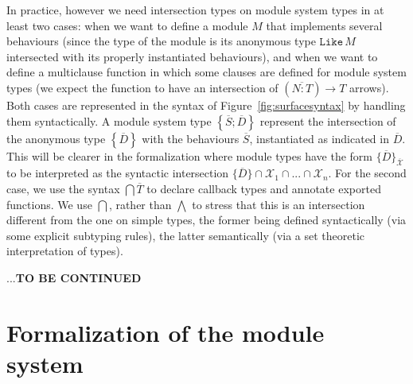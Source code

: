 \documentclass[a4paper,10pt]{article}
\begin{document}
  In practice, however we need intersection types on module system types in at least two cases: when we want to define a module $M$ that implements several behaviours (since the type of the module is its anonymous type $\texttt{Like}\,M$ intersected with its properly instantiated behaviours), and when we want to define a multiclause function in which some clauses are defined for module system types (we expect the function to have an intersection of $(\overline{N:T})\to T$ arrows). Both cases are represented in the syntax of Figure~\ref{fig:surfacesyntax} by handling them syntactically. A module system type $\left\{\overline{S};\overline{D}\right\}$ represent the intersection of the anonymous type $\left\{\overline{D}\right\}$ with the behaviours $\overline{S}$, instantiated as indicated in $\overline{D}$. This will be clearer in the formalization where module types have the form $\{\overline{D}\}_{\overline{\mathcal X}}$ to be interpreted as the syntactic intersection $\{\overline D\}\cap{\mathcal X_1}\cap...\cap{\mathcal X_n}$. For the second case, we use the syntax $\bigcap \overline{T}$ to declare callback types and annotate exported functions. We use $\bigcap$, rather than $\bigwedge$ to stress that this is an intersection different from the one on simple types, the former being defined syntactically (via some explicit subtyping rules), the latter semantically (via a set theoretic interpretation of types).

  ...\textbf{TO BE CONTINUED}




\section{Formalization of the module system}
\end{document}
